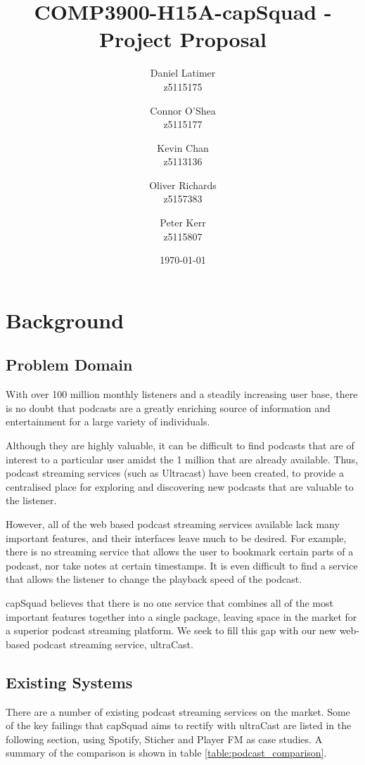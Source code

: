 \documentclass[12pt]{article}
\title{COMP3900-H15A-capSquad - Project Proposal}
\date{\today}
\author{
    Daniel Latimer \\ z5115175 \and
    Connor O'Shea \\ z5115177 \and
    Kevin Chan \\ z5113136 \and
    Oliver Richards \\ z5157383 \and
    Peter Kerr \\ z5115807}
\begin{document}
\maketitle
\tableofcontents
\newpage

\section{Background}
\subsection{Problem Domain}
With over 100 million monthly listeners\cite{musicoomph} and a steadily increasing user base, there is no doubt that podcasts are a greatly enriching source of information and entertainment for a large variety of individuals.

Although they are highly valuable, it can be difficult to find podcasts that are of interest to a particular user amidst the 1 million\cite{musicoomph} that are already available.
Thus, podcast streaming services (such as Ultracast) have been created, to provide a centralised place for exploring and discovering new podcasts that are valuable to the listener.

However, all of the web based podcast streaming services available lack many important features, and their interfaces leave much to be desired. For example, there is no streaming service that allows the user to bookmark certain parts of a podcast, nor take notes at certain timestamps. It is even difficult to find a service that allows the listener to change the playback speed of the podcast.

capSquad believes that there is no one service that combines all of the most important features together into a single package, leaving space in the market for a superior podcast streaming platform. We seek to fill this gap with our new web-based podcast streaming service, ultraCast.

\subsection{Existing Systems}
There are a number of existing podcast streaming services on the market. Some of the key failings that capSquad aims to rectify with ultraCast are listed in the following section, using Spotify\cite{spotify}, Sticher\cite{sticher} and Player FM\cite{player_fm} as case studies.
A summary of the comparison is shown in table \ref{table:podcast_comparison}.
\end{document}
